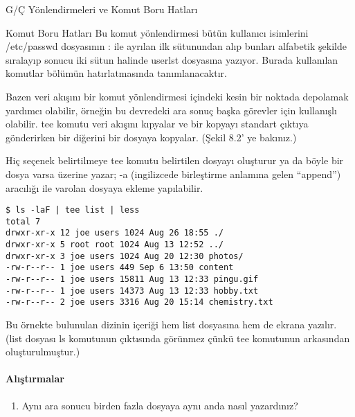 \begin{section}{G/Ç Yönlendirmeleri ve Komut Boru Hatları}
\begin{subsection}{Komut Boru Hatları}
Bu komut yönlendirmesi bütün kullanıcı isimlerini /etc/passwd dosyasının : ile ayrılan ilk sütunundan alıp bunları alfabetik şekilde sıralayıp sonucu iki sütun halinde userlst dosyasına yazıyor. Burada kullanılan komutlar bölümün hatırlatmasında tanımlanacaktır.

Bazen veri akışını bir komut yönlendirmesi içindeki kesin bir noktada depolamak yardımcı olabilir, örneğin bu devredeki ara sonuç başka görevler için kullanışlı olabilir. tee komutu veri akışını kıpyalar ve bir kopyayı standart çıktıya gönderirken bir diğerini bir dosyaya kopyalar. (Şekil 8.2' ye bakınız.)

Hiç seçenek belirtilmeye tee komutu belirtilen dosyayı oluşturur ya da böyle bir dosya varsa üzerine yazar; -a (ingilizcede birleştirme anlamına gelen “append”) aracılığı ile varolan dosyaya ekleme yapılabilir.
\footnotesize
\begin{verbatim}
$ ls -laF | tee list | less
total 7
drwxr-xr-x 12 joe users 1024 Aug 26 18:55 ./
drwxr-xr-x 5 root root 1024 Aug 13 12:52 ../
drwxr-xr-x 3 joe users 1024 Aug 20 12:30 photos/
-rw-r--r-- 1 joe users 449 Sep 6 13:50 content
-rw-r--r-- 1 joe users 15811 Aug 13 12:33 pingu.gif
-rw-r--r-- 1 joe users 14373 Aug 13 12:33 hobby.txt
-rw-r--r-- 2 joe users 3316 Aug 20 15:14 chemistry.txt
\end{verbatim}
\normalsize

Bu örnekte bulunulan dizinin içeriği hem list dosyasına hem de ekrana yazılır. (list dosyası ls komutunun çıktısında görünmez çünkü tee komutunun arkasından oluşturulmuştur.)

\paragraph{{\Huge{\PencilLeftDown}}Alıştırmalar}{
\begin{enumerate}
 \item Aynı ara sonucu birden fazla dosyaya aynı anda nasıl yazardınız?
\end{enumerate}}
\end{subsection}
\end{section}
